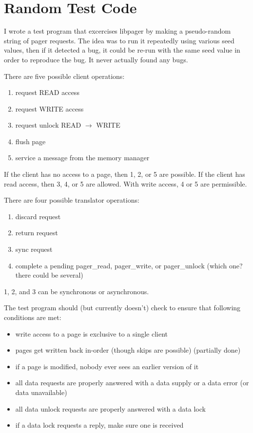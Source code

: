 \documentclass{article}
\begin{document}
\section{Random Test Code}

I wrote a test program that excercises libpager by making a
pseudo-random string of pager requests.  The idea was to run it
repeatedly using various seed values, then if it detected a bug, it
could be re-run with the same seed value in order to reproduce the
bug.  It never actually found any bugs.

There are five possible client operations:

\begin{enumerate}
\item request READ access
\item request WRITE access
\item request unlock READ $\to$ WRITE
\item flush page
\item service a message from the memory manager
\end{enumerate}

If the client has no access to a page, then 1, 2, or 5 are possible.
If the client has read access, then 3, 4, or 5 are allowed.  With
write access, 4 or 5 are permissible.

There are four possible translator operations:

\begin{enumerate}
\item discard request
\item return request
\item sync request
\item complete a pending pager_read, pager_write, or pager_unlock (which one? there could be several)
\end{enumerate}

1, 2, and 3 can be synchronous or asynchronous.

The test program should (but currently doesn't) check to ensure that
following conditions are met:

\begin{itemize}
\item write access to a page is exclusive to a single client
\item pages get written back in-order (though skips are possible) (partially done)
\item if a page is modified, nobody ever sees an earlier version of it
\item all data requests are properly answered with a data supply or a data error (or data unavailable)
\item all data unlock requests are properly answered with a data lock
\item if a data lock requests a reply, make sure one is received
\end{itemize}
\end{document}
